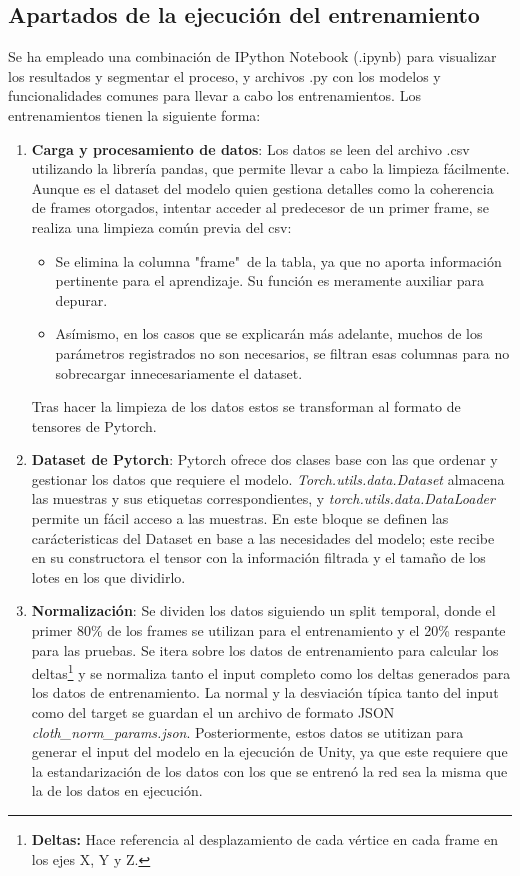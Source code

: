\subsection{Apartados de la ejecución del entrenamiento}
 Se ha empleado una combinación de IPython Notebook (.ipynb) para visualizar los resultados y segmentar el proceso, y archivos .py con los modelos y funcionalidades comunes para llevar a cabo los entrenamientos. Los entrenamientos tienen la siguiente forma:
\begin{enumerate}

    \item \textbf{Carga y procesamiento de datos}: 
    Los datos se leen del archivo .csv utilizando la librería pandas, que permite llevar a cabo la limpieza fácilmente. Aunque es el dataset del modelo quien gestiona detalles como la coherencia de frames otorgados, intentar acceder al predecesor de un primer frame, se realiza una limpieza común previa del csv:
    \begin{itemize}
        \item Se elimina la columna "frame"\ de la tabla, ya que no aporta información pertinente para el aprendizaje. Su función es meramente auxiliar para depurar.
        \item Asímismo, en los casos que se explicarán más adelante, muchos de los parámetros registrados no son necesarios, se filtran esas columnas para no sobrecargar innecesariamente el dataset.
    \end{itemize}
    Tras hacer la limpieza de los datos estos se transforman al formato de tensores de Pytorch. 

    \item \textbf{Dataset de Pytorch}: Pytorch ofrece dos clases base con las que ordenar y gestionar los datos que requiere el modelo. \textit{Torch.utils.data.Dataset} almacena las muestras y sus etiquetas correspondientes, y \textit{torch.utils.data.DataLoader} permite un fácil acceso a las muestras. En este bloque se definen las carácteristicas del Dataset en base a las necesidades del modelo; este recibe en su constructora el tensor con la información filtrada y el tamaño de los lotes en los que dividirlo.

    \item \textbf{Normalización}: Se dividen los datos siguiendo un split temporal, donde el primer 80\% de los frames se utilizan para el entrenamiento y el 20\% respante para las pruebas. Se itera sobre los datos de entrenamiento para calcular los deltas\footnote{\textbf{Deltas:} Hace referencia al desplazamiento de cada vértice en cada frame en los ejes X, Y y Z.} y se normaliza tanto el input completo como los deltas generados para los datos de entrenamiento. La normal y la desviación típica tanto del input como del target se guardan el un archivo de formato JSON \textit{cloth\_norm\_params.json}. Posteriormente, estos datos se utitizan para generar el input del modelo en la ejecución de Unity, ya que este requiere que la estandarización de los datos con los que se entrenó la red sea la misma que la de los datos en ejecución.


\end{enumerate}
